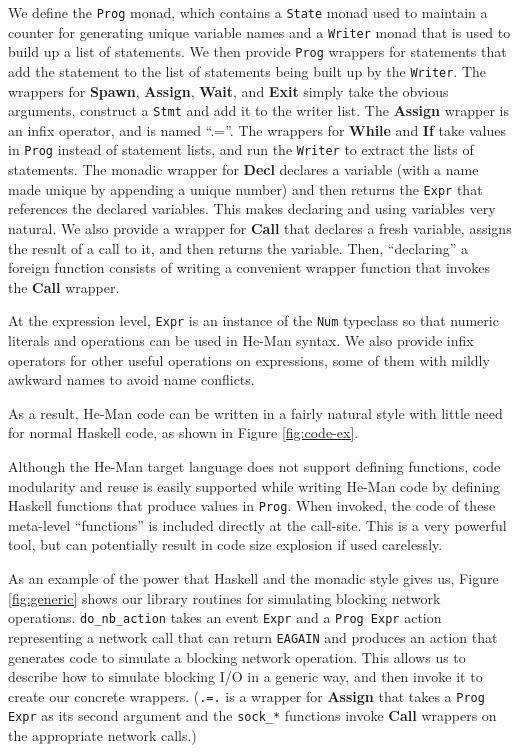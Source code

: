 \documentclass[preprint,10pt]{sigplanconf}
\renewcommand{\t}{\texttt}
\renewcommand{\b}{\textbf}
\begin{document}
We define the \t{Prog} monad, which contains a \t{State} monad used to
maintain a counter for generating unique variable names and a
\t{Writer} monad that is used to build up a list of statements. We
then provide \t{Prog} wrappers for statements that add the statement
to the list of statements being built up by the \t{Writer}. The
wrappers for \b{Spawn}, \b{Assign}, \b{Wait}, and \b{Exit} simply take
the obvious arguments, construct a \t{Stmt} and add it to the writer
list. The \b{Assign} wrapper is an infix operator, and is named
``.=''. The wrappers for \b{While} and \b{If} take values in \t{Prog}
instead of statement lists, and run the \t{Writer} to extract the
lists of statements. The monadic wrapper for \b{Decl} declares a
variable (with a name made unique by appending a unique number) and
then returns the \t{Expr} that references the declared variables. This
makes declaring and using variables very natural. We also provide a
wrapper for \b{Call} that declares a fresh variable, assigns the
result of a call to it, and then returns the variable. Then,
``declaring'' a foreign function consists of writing a convenient
wrapper function that invokes the \b{Call} wrapper.

At the expression level, \t{Expr} is an instance of the \t{Num} typeclass 
so that numeric literals and operations can be used in He-Man
syntax. We also provide infix operators for other useful operations on
expressions, some of them with mildly awkward names to avoid name conflicts.

As a result, He-Man code can be written in a fairly natural style with little
need for normal Haskell code, as shown in Figure \ref{fig:code-ex}.

Although the He-Man target language does not support defining
functions, code modularity and reuse is easily supported while writing
He-Man code by defining Haskell functions that produce values in
\t{Prog}. When invoked, the code of these meta-level ``functions'' is
included directly at the call-site. This is a very powerful tool, but
can potentially result in code size explosion if used carelessly.

As an example of the power that Haskell and the monadic style gives
us, Figure \ref{fig:generic} shows our library routines for simulating
blocking network operations. \t{do\_nb\_action} takes an event
\t{Expr} and a \t{Prog Expr} action representing a network call that
can return \t{EAGAIN} and produces an action that generates code to
simulate a blocking network operation. This allows us to describe how
to simulate blocking I/O in a generic way, and then invoke it to
create our concrete wrappers. (\t{.=.} is a wrapper for \b{Assign} 
that takes a \t{Prog Expr} as its second argument and the \t{sock\_*} 
functions invoke \b{Call} wrappers on the appropriate network calls.)
\end{document}
